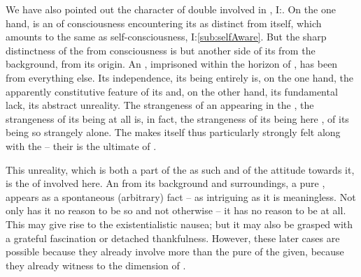 \pa\label{pa:madSpontaneity}
We have also pointed out the character of double  involved in
, I:. On the one hand,  is
an  of consciousness encountering its  as distinct from
itself, which amounts to the same as self-consciousness, I:\ref{sub:selfAware}.
But the sharp distinctness of the  from consciousness is but another
side of its  from the background, from its origin.  An
, imprisoned within the horizon of , has been
 from everything else. Its independence, its being entirely
 is, on the one hand, the apparently constitutive feature of its
 and, on the other hand, its fundamental lack, its abstract
unreality.  The strangeness of an  appearing in the , the strangeness of its being at all is, in fact, the strangeness
of its being here , of its being so strangely alone.  The
 makes itself thus particularly strongly felt along
with the  -- their  is the ultimate
 of .

This unreality, which is both a part of the  as such
and of the  attitude towards it, is the  of
 involved here.  An  from its
background and surroundings, a pure , appears as a spontaneous
(arbitrary) fact  -- as intriguing as it is meaningless.  Not
only has it no reason to be so and not otherwise -- it has no reason to be at
all.   This may give rise to the
existentialistic {nausea}; but it may also be grasped with a grateful
fascination or detached thankfulness.  However, these later cases are possible
because they already involve more than the pure  of the given,
because they already witness to the  dimension of
.


